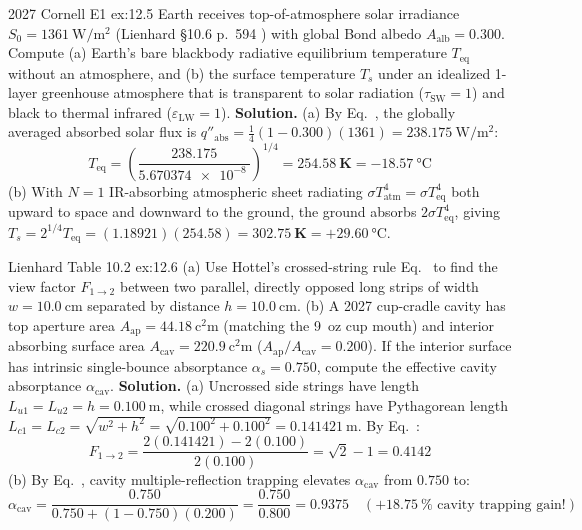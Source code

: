 \begin{workedexample}{2027 Cornell E1 }{ex:12.5}
Earth receives top-of-atmosphere solar irradiance $S_0 = \SI{1361}{\watt\per\square\meter}$ (Lienhard §10.6 p.~594 ) with global Bond albedo $A_{\mathrm{alb}} = 0.300$. Compute (a) Earth's bare blackbody radiative equilibrium temperature $T_{\mathrm{eq}}$ without an atmosphere, and (b) the surface temperature $T_s$ under an idealized 1-layer greenhouse atmosphere that is transparent to solar radiation ($\tau_{\mathrm{SW}}=1$) and black to thermal infrared ($\varepsilon_{\mathrm{LW}}=1$).
\tcblower
\textbf{Solution.} (a) By Eq.~, the globally averaged absorbed solar flux is $q''_{\mathrm{abs}} = \frac{1}{4}(1 - 0.300)(1361) = \SI{238.175}{\watt\per\square\meter}$:
\[
  T_{\mathrm{eq}} = \left(\frac{238.175}{\SI{5.670374e-8}{}}\right)^{\!1/4} = \mathbf{\SI{254.58}{\kelvin}} = -\SI{18.57}{\celsius}
\]
(b) With $N=1$ IR-absorbing atmospheric sheet radiating $\sigma T_{\mathrm{atm}}^4 = \sigma T_{\mathrm{eq}}^4$ both upward to space and downward to the ground, the ground absorbs $2\sigma T_{\mathrm{eq}}^4$, giving $T_s = 2^{1/4}T_{\mathrm{eq}} = (1.18921)(254.58) = \mathbf{\SI{302.75}{\kelvin}} = +\SI{29.60}{\celsius}$.
\end{workedexample}

\begin{workedexample}{Lienhard Table 10.2 }{ex:12.6}
(a) Use Hottel's crossed-string rule Eq.~ to find the view factor $F_{1\to 2}$ between two parallel, directly opposed long strips of width $w = \SI{10.0}{\centi\meter}$ separated by distance $h = \SI{10.0}{\centi\meter}$. (b) A 2027 cup-cradle cavity has top aperture area $A_{\mathrm{ap}} = \SI{44.18}{\square\centi\meter}$ (matching the 9~oz cup mouth) and interior absorbing surface area $A_{\mathrm{cav}} = \SI{220.9}{\square\centi\meter}$ ($A_{\mathrm{ap}}/A_{\mathrm{cav}} = 0.200$). If the interior surface has intrinsic single-bounce absorptance $\alpha_s = 0.750$, compute the effective cavity absorptance $\alpha_{\mathrm{cav}}$.
\tcblower
\textbf{Solution.} (a) Uncrossed side strings have length $L_{u1} = L_{u2} = h = \SI{0.100}{\meter}$, while crossed diagonal strings have Pythagorean length $L_{c1} = L_{c2} = \sqrt{w^2 + h^2} = \sqrt{0.100^2 + 0.100^2} = \SI{0.141421}{\meter}$. By Eq.~:
\[
  F_{1\to 2} = \frac{2(0.141421) - 2(0.100)}{2(0.100)} = \sqrt{2} - 1 = \mathbf{0.4142}
\]
(b) By Eq.~, cavity multiple-reflection trapping elevates $\alpha_{\mathrm{cav}}$ from $0.750$ to:
\[
  \alpha_{\mathrm{cav}} = \frac{0.750}{0.750 + (1 - 0.750)(0.200)} = \frac{0.750}{0.800} = \mathbf{0.9375} \quad (+\SI{18.75}{\percent}\text{ cavity trapping gain!})
\]
\end{workedexample}

